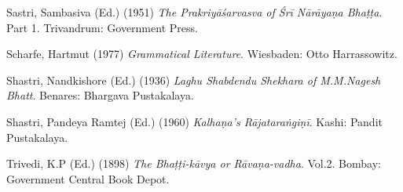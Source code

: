 \begin{thebibliography}{99}
Sastri, Sambasiva (Ed.) (1951) {\sl The Prakriyāśarvasva of Śrī Nārāyaṇa Bhaṭṭa}. Part 1. Trivandrum: Government Press. 

Scharfe, Hartmut (1977) {\sl Grammatical Literature}. Wiesbaden: Otto Harrassowitz. 

Shastri, Nandkishore (Ed.) (1936) {\sl Laghu Shabdendu Shekhara of M.M.Nagesh Bhatt}. Benares: Bhargava Pustakalaya. 

Shastri, Pandeya Ramtej (Ed.) (1960) {\sl Kalhaṇa’s Rājataraṅgiṇī}. Kashi: Pandit Pustakalaya. 

Trivedi, K.P (Ed.) (1898) {\sl The Bhaṭṭi-kāvya or Rāvaṇa-vadha}. Vol.2. Bombay: Government Central Book Depot. 
\end{thebibliography}

\theendnotes
\label{chapter\thechapter:end}

